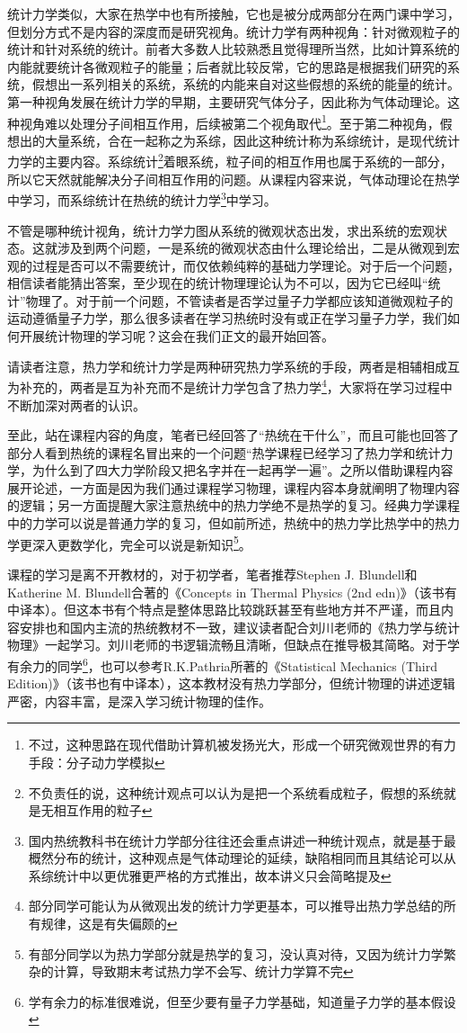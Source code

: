 \documentclass[../../main.tex]{subfiles}
\begin{document}
统计力学类似，大家在热学中也有所接触，它也是被分成两部分在两门课中学习，但划分方式不是内容的深度而是研究视角。统计力学有两种视角：针对微观粒子的统计和针对系统的统计。前者大多数人比较熟悉且觉得理所当然，比如计算系统的内能就要统计各微观粒子的能量；后者就比较反常，它的思路是根据我们研究的系统，假想出一系列相关的系统，系统的内能来自对这些假想的系统的能量的统计。第一种视角发展在统计力学的早期，主要研究气体分子，因此称为气体动理论。这种视角难以处理分子间相互作用，后续被第二个视角取代\footnote{不过，这种思路在现代借助计算机被发扬光大，形成一个研究微观世界的有力手段：分子动力学模拟}。至于第二种视角，假想出的大量系统，合在一起称之为系综，因此这种统计称为系综统计，是现代统计力学的主要内容。系综统计\footnote{不负责任的说，这种统计观点可以认为是把一个系统看成粒子，假想的系统就是无相互作用的粒子}着眼系统，粒子间的相互作用也属于系统的一部分，所以它天然就能解决分子间相互作用的问题。从课程内容来说，气体动理论在热学中学习，而系综统计在热统的统计力学\footnote{国内热统教科书在统计力学部分往往还会重点讲述一种统计观点，就是基于最概然分布的统计，这种观点是气体动理论的延续，缺陷相同而且其结论可以从系综统计中以更优雅更严格的方式推出，故本讲义只会简略提及}中学习。

不管是哪种统计视角，统计力学力图从系统的微观状态出发，求出系统的宏观状态。这就涉及到两个问题，一是系统的微观状态由什么理论给出，二是从微观到宏观的过程是否可以不需要统计，而仅依赖纯粹的基础力学理论。对于后一个问题，相信读者能猜出答案，至少现在的统计物理理论认为不可以，因为它已经叫“统计”物理了。对于前一个问题，不管读者是否学过量子力学都应该知道微观粒子的运动遵循量子力学，那么很多读者在学习热统时没有或正在学习量子力学，我们如何开展统计物理的学习呢？这会在我们正文的最开始回答。

请读者注意，热力学和统计力学是两种研究热力学系统的手段，两者是相辅相成互为补充的，两者是互为补充而不是统计力学包含了热力学\footnote{部分同学可能认为从微观出发的统计力学更基本，可以推导出热力学总结的所有规律，这是有失偏颇的}，大家将在学习过程中不断加深对两者的认识。

至此，站在课程内容的角度，笔者已经回答了“热统在干什么”，而且可能也回答了部分人看到热统的课程名冒出来的一个问题“热学课程已经学习了热力学和统计力学，为什么到了四大力学阶段又把名字并在一起再学一遍”。之所以借助课程内容展开论述，一方面是因为我们通过课程学习物理，课程内容本身就阐明了物理内容的逻辑；另一方面提醒大家注意热统中的热力学绝不是热学的复习。经典力学课程中的力学可以说是普通力学的复习，但如前所述，热统中的热力学比热学中的热力学更深入更数学化，完全可以说是新知识\footnote{有部分同学以为热力学部分就是热学的复习，没认真对待，又因为统计力学繁杂的计算，导致期末考试热力学不会写、统计力学算不完}。

课程的学习是离不开教材的，对于初学者，笔者推荐Stephen J. Blundell和Katherine M. Blundell合著的《Concepts in Thermal Physics (2nd edn)》（该书有中译本）。但这本书有个特点是整体思路比较跳跃甚至有些地方并不严谨，而且内容安排也和国内主流的热统教材不一致，建议读者配合刘川老师的《热力学与统计物理》一起学习。刘川老师的书逻辑流畅且清晰，但缺点在推导极其简略。对于学有余力的同学\footnote{学有余力的标准很难说，但至少要有量子力学基础，知道量子力学的基本假设}，也可以参考R.K.Pathria所著的《Statistical Mechanics (Third Edition)》（该书也有中译本），这本教材没有热力学部分，但统计物理的讲述逻辑严密，内容丰富，是深入学习统计物理的佳作。
\end{document}
